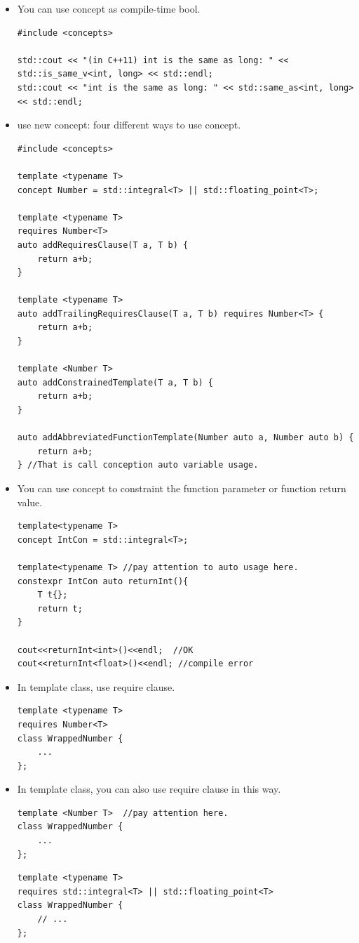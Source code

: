 \documentclass[a4paper,11pt,twoside]{book}
\begin{document}
\begin{itemize}
    \item You can use concept as compile-time bool.

\begin{lstlisting}
#include <concepts>

std::cout << "(in C++11) int is the same as long: " << std::is_same_v<int, long> << std::endl;
std::cout << "int is the same as long: " << std::same_as<int, long> << std::endl;
\end{lstlisting}

    \item use new concept: four different ways to use concept.
\begin{lstlisting}
#include <concepts>

template <typename T>
concept Number = std::integral<T> || std::floating_point<T>;

template <typename T>
requires Number<T>
auto addRequiresClause(T a, T b) {
	return a+b;
}

template <typename T>
auto addTrailingRequiresClause(T a, T b) requires Number<T> {
	return a+b;
}

template <Number T>
auto addConstrainedTemplate(T a, T b) {
	return a+b;
}

auto addAbbreviatedFunctionTemplate(Number auto a, Number auto b) {
	return a+b;
} //That is call conception auto variable usage.
\end{lstlisting}


\item You can use concept to constraint the function parameter or function return value.
\begin{lstlisting}
template<typename T>
concept IntCon = std::integral<T>;

template<typename T> //pay attention to auto usage here. 
constexpr IntCon auto returnInt(){ 
	T t{};
	return t;
}

cout<<returnInt<int>()<<endl;  //OK
cout<<returnInt<float>()<<endl; //compile error
\end{lstlisting}

\item In template class, use require clause.
\begin{lstlisting}
template <typename T>
requires Number<T>
class WrappedNumber {
	...
};
\end{lstlisting}

\item In template class, you can also use require clause in this way.
\begin{lstlisting}
template <Number T>  //pay attention here.
class WrappedNumber {
	...
};
\end{lstlisting}

\begin{lstlisting}
template <typename T>
requires std::integral<T> || std::floating_point<T>
class WrappedNumber {
	// ...
};
\end{lstlisting}

\end{itemize}
\end{document}
